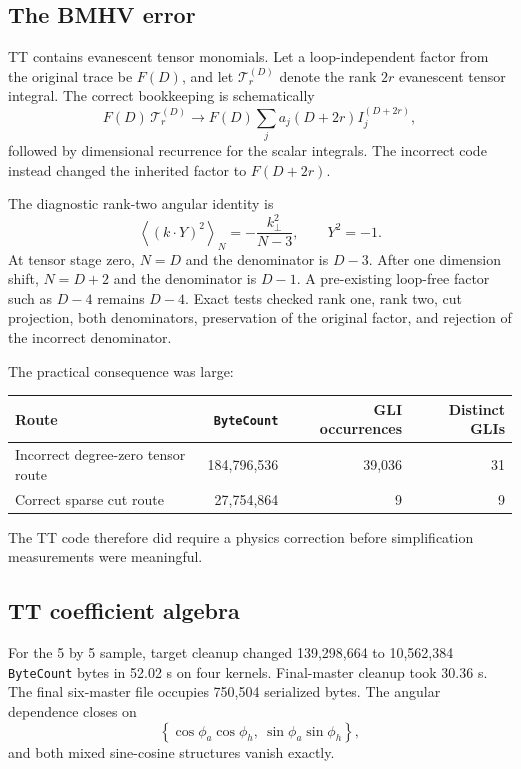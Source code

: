 \documentclass[11pt]{article}
\newcommand{\code}[1]{\texttt{#1}}
\begin{document}
\subsection{The BMHV error}

TT contains evanescent tensor monomials.  Let a loop-independent factor from
the original trace be $F(D)$, and let $\mathcal T_r^{(D)}$ denote the rank
$2r$ evanescent tensor integral.  The correct bookkeeping is schematically
\begin{equation}
  F(D)\,\mathcal T_r^{(D)}
  \longrightarrow
  F(D)\sum_j a_j(D+2r)I_j^{(D+2r)},
  \label{eq:tt-correct}
\end{equation}
followed by dimensional recurrence for the scalar integrals.  The incorrect
code instead changed the inherited factor to $F(D+2r)$.

The diagnostic rank-two angular identity is
\begin{equation}
  \left\langle (k\cdot Y)^2\right\rangle_N
  =-\frac{k_\perp^2}{N-3},\qquad Y^2=-1.
  \label{eq:tt-toy}
\end{equation}
At tensor stage zero, $N=D$ and the denominator is $D-3$.  After one
dimension shift, $N=D+2$ and the denominator is $D-1$.  A pre-existing
loop-free factor such as $D-4$ remains $D-4$.  Exact tests checked rank one,
rank two, cut projection, both denominators, preservation of the original
factor, and rejection of the incorrect denominator.

The practical consequence was large:
\begin{center}
\begin{tabular}{@{}lrrr@{}}
\toprule
Route & \code{ByteCount} & GLI occurrences & Distinct GLIs \\
\midrule
Incorrect degree-zero tensor route & 184,796,536 & 39,036 & 31 \\
Correct sparse cut route & 27,754,864 & 9 & 9 \\
\bottomrule
\end{tabular}
\end{center}
\par\medskip
The TT code therefore did require a physics correction before simplification
measurements were meaningful.

\subsection{TT coefficient algebra}

For the 5 by 5 sample, target cleanup changed
139,298,664 to 10,562,384 \code{ByteCount} bytes in 52.02 s on four kernels.
Final-master cleanup took 30.36 s.  The final six-master file occupies 750,504
serialized bytes.  The angular dependence closes on
\begin{equation}
  \left\{\cos\phi_a\cos\phi_h,\ \sin\phi_a\sin\phi_h\right\},
\end{equation}
and both mixed sine-cosine structures vanish exactly.
\end{document}
